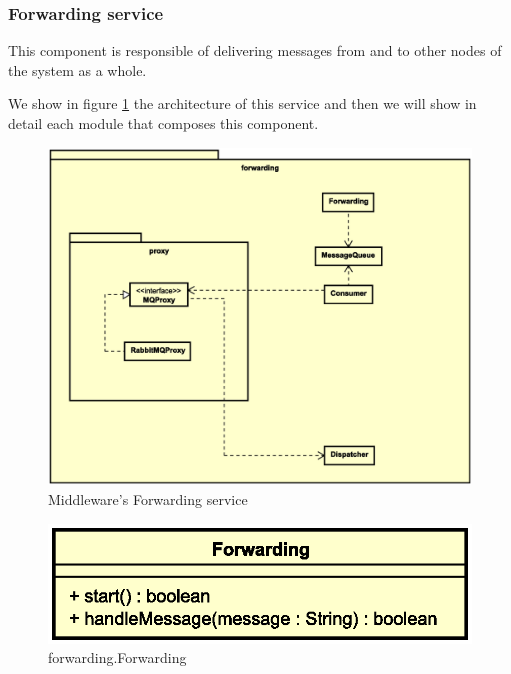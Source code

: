 \subsubsection{Forwarding service}

This component is responsible of delivering messages from and to other nodes of
the system as a whole.

We show in figure \ref{fig:mw-forwarding} the architecture of this service and
then we will show in detail each module that composes this component.

\begin{figure}[H]
  \centering
  \includegraphics[width=\columnwidth]{images/solution/mw/forwarding.eps}
  \caption{Middleware's Forwarding service}
  \label{fig:mw-forwarding}
\end{figure}


\begin{figure}[H]
  \centering
  \includegraphics[width=.5\columnwidth]{images/solution/mw/fwd/fwd.eps}
  \caption{forwarding.Forwarding}
  \label{fig:mw-forwarding-forwarding}
\end{figure}

